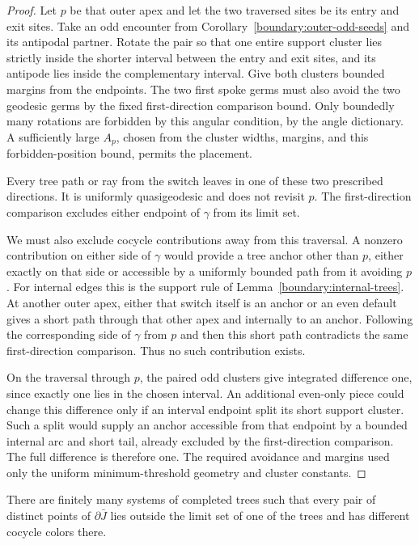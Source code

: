 \begin{proof}
Let $p$ be that outer apex and let the two traversed sites be its entry and
exit sites. Take an odd encounter from
Corollary~\ref{boundary:outer-odd-seeds} and its antipodal partner. Rotate
the pair so that one entire support cluster lies strictly inside the
shorter interval between the entry and exit sites, and its antipode lies
inside the complementary interval. Give both clusters bounded margins
from the endpoints. The two first spoke germs must also avoid the two
geodesic germs by the fixed first-direction comparison bound. Only
boundedly many rotations are forbidden by this angular condition, by the
angle dictionary. A sufficiently large $A_p$, chosen from the cluster
widths, margins, and this forbidden-position bound, permits the placement.

Every tree path or ray from the switch leaves in one of these two
prescribed directions. It is uniformly quasigeodesic and does not revisit
$p$. The first-direction comparison excludes either endpoint of
$\gamma$ from its limit set.

We must also exclude cocycle contributions away from this traversal. A
nonzero contribution on either side of $\gamma$ would provide a tree
anchor other than $p$, either exactly on that side or accessible by a
uniformly bounded path from it avoiding $p$. For internal edges this is
the support rule of Lemma~\ref{boundary:internal-trees}. At another outer
apex, either that switch itself is an anchor or an even default gives a
short path through that other apex and internally to an anchor. Following
the corresponding side of $\gamma$ from $p$ and then this short path
contradicts the same first-direction comparison. Thus no such
contribution exists.

On the traversal through $p$, the paired odd clusters give integrated
difference one, since exactly one lies in the chosen interval. An
additional even-only piece could change this difference only if an
interval endpoint split its short support cluster. Such a split would
supply an anchor accessible from that endpoint by a bounded internal arc
and short tail, already excluded by the first-direction comparison.
The full difference is therefore one. The required avoidance and margins
used only the uniform minimum-threshold geometry and cluster constants.
\end{proof}

\begin{proposition}\label{boundary:separation}
There are finitely many systems of completed trees such that every pair of
distinct points of $\partial\bar J$ lies outside the limit set of one of
the trees and has different cocycle colors there.
\end{proposition}

